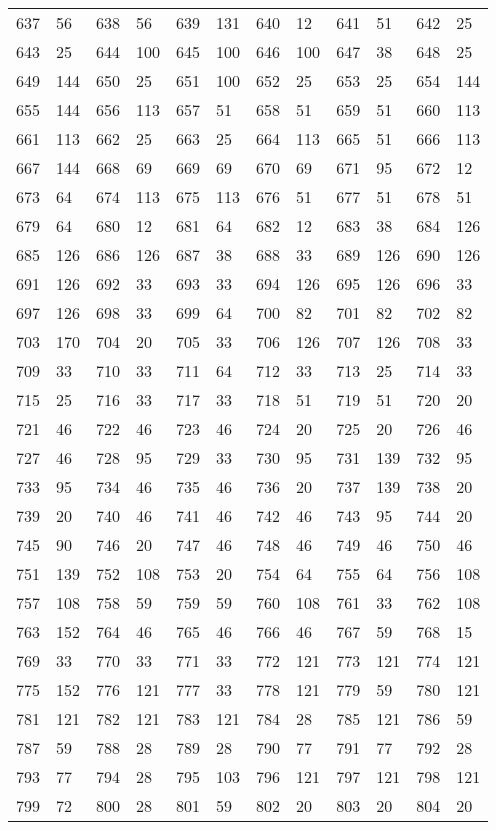 \begin{longtable}{llllllllllll}
637 & 56&638 &56&639& 131&640 &12&641 &51&642& 25\\
643 & 25&644 &100&645& 100&646 &100&647 &38&648& 25\\
649 & 144&650 &25&651& 100&652 &25&653 &25&654& 144\\
655 & 144&656 &113&657& 51&658 &51&659 &51&660& 113\\
661 & 113&662 &25&663& 25&664 &113&665 &51&666& 113\\
667 & 144&668 &69&669& 69&670 &69&671 &95&672& 12\\
673 & 64&674 &113&675& 113&676 &51&677 &51&678& 51\\
679 & 64&680 &12&681& 64&682 &12&683 &38&684& 126\\
685 & 126&686 &126&687& 38&688 &33&689 &126&690& 126\\
691 & 126&692 &33&693& 33&694 &126&695 &126&696& 33\\
697 & 126&698 &33&699& 64&700 &82&701 &82&702& 82\\
703 & 170&704 &20&705& 33&706 &126&707 &126&708& 33\\
709 & 33&710 &33&711& 64&712 &33&713 &25&714& 33\\
715 & 25&716 &33&717& 33&718 &51&719 &51&720& 20\\
721 & 46&722 &46&723& 46&724 &20&725 &20&726& 46\\
727 & 46&728 &95&729& 33&730 &95&731 &139&732& 95\\
733 & 95&734 &46&735& 46&736 &20&737 &139&738& 20\\
739 & 20&740 &46&741& 46&742 &46&743 &95&744& 20\\
745 & 90&746 &20&747& 46&748 &46&749 &46&750& 46\\
751 & 139&752 &108&753& 20&754 &64&755 &64&756& 108\\
757 & 108&758 &59&759& 59&760 &108&761 &33&762& 108\\
763 & 152&764 &46&765& 46&766 &46&767 &59&768& 15\\
769 & 33&770 &33&771& 33&772 &121&773 &121&774& 121\\
775 & 152&776 &121&777& 33&778 &121&779 &59&780& 121\\
781 & 121&782 &121&783& 121&784 &28&785 &121&786& 59\\
787 & 59&788 &28&789& 28&790 &77&791 &77&792& 28\\
793 & 77&794 &28&795& 103&796 &121&797 &121&798& 121\\
799 & 72&800 &28&801& 59&802 &20&803 &20&804& 20\\

\end{longtable}
